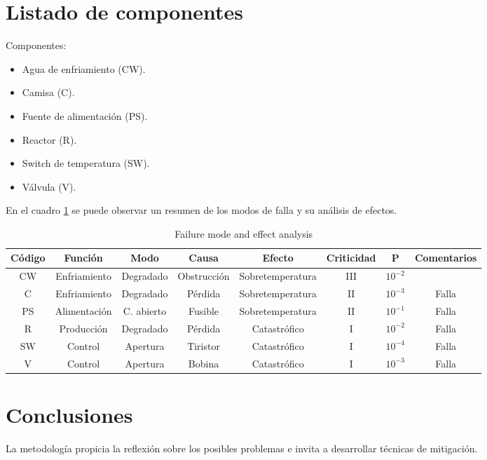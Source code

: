 \documentclass[
    11pt,
    spanish,
    a4paper
]{article}
\begin{document}
\section{Listado de componentes}

Componentes:

\begin{itemize}
	\item Agua de enfriamiento (CW).
	\item Camisa (C).
	\item Fuente de alimentación (PS).
	\item Reactor (R).
	\item Switch de temperatura (SW).
	\item Válvula (V).
\end{itemize}

En el cuadro \ref{tab:failure} se puede observar un resumen de los modos de falla y su análisis de efectos.

\begin{table}[h]
	\centering
	\caption[Failure mode and effect analysis]{Failure mode and effect analysis}
	\begin{tabular}{c c c c c c c c}
		\toprule
		\textbf{Código} & \textbf{Función} & \textbf{Modo} & \textbf{Causa} & \textbf{Efecto}  & \textbf{Criticidad} & \textbf{P} & \textbf{Comentarios} \\
		\midrule
		CW              & Enfriamiento     & Degradado     & Obstrucción    & Sobretemperatura & III                 & $10^{-2}$    &                      \\
		C               & Enfriamiento     & Degradado     & Pérdida        & Sobretemperatura & II                  & $10^{-3}$          & Falla                \\
		PS              & Alimentación     & C. abierto    & Fusible        & Sobretemperatura & II                  & $10^{-1}$          & Falla                \\
		R               & Producción       & Degradado     & Pérdida        & Catastrófico     & I                   & $10^{-2}$          & Falla                \\
		SW              & Control          & Apertura      & Tiristor       & Catastrófico     & I                   & $10^{-4}$          & Falla                \\
		V               & Control          & Apertura      & Bobina         & Catastrófico     & I                   & $10^{-3}$          & Falla                \\
		\bottomrule
		\hline
	\end{tabular}
	\label{tab:failure}
\end{table}

\section{Conclusiones}

La metodología propicia la reflexión sobre los posibles problemas e invita a desarrollar técnicas de mitigación.
\end{document}
